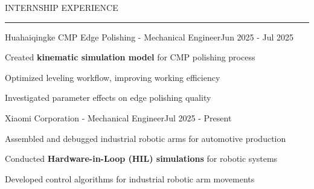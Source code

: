 \documentclass{resume} %
\renewenvironment{rSection}[1]{
\sectionskip
\textcolor{TsinghuaPurple}{\MakeUppercase{#1}}
\sectionlineskip
\hrule
\begin{list}{}{
\setlength{\leftmargin}{0em}
}
\item[]
}{
\end{list}
}
\begin{document}
\begin{rSection}{Internship Experience}

\begin{rSubsection}{Huahaiqingke CMP Edge Polishing - Mechanical Engineer}{Jun 2025 - Jul 2025}{}{}
    \item Created \textbf{kinematic simulation model} for CMP polishing process
    \item Optimized leveling workflow, improving working efficiency
    \item Investigated parameter effects on edge polishing quality
\end{rSubsection}

\begin{rSubsection}{Xiaomi Corporation - Mechanical Engineer}{Jul 2025 - Present}{}{}
    \item Assembled and debugged industrial robotic arms for automotive production
    \item Conducted \textbf{Hardware-in-Loop (HIL) simulations} for robotic systems
    \item Developed control algorithms for industrial robotic arm movements
\end{rSubsection}

\end{rSection}


 




\end{document}
